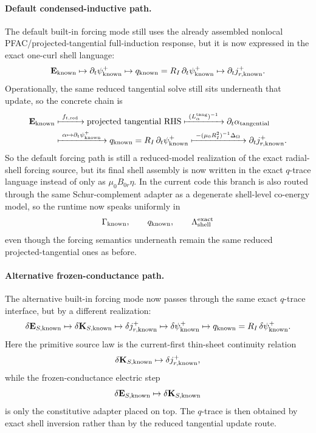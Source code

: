 \documentclass[11pt,a4paper]{article}
\begin{document}
\paragraph{Default condensed-inductive path.}
The default built-in forcing mode still uses the already assembled nonlocal
PFAC/projected-tangential full-induction response, but it is now expressed in
the exact one-curl shell language:
\[
\mathbf E_{\rm known}
\mapsto
\partial_t\psi_{\rm known}^+
\mapsto
q_{\rm known}=R_I\,\partial_t\psi_{\rm known}^+
\mapsto
\partial_t j_{r,\rm known}^+.
\]
Operationally, the same reduced tangential solve still sits underneath that
update, so the concrete chain is
\begin{equation}
\begin{aligned}
\mathbf E_{\rm known}
&\xmapsto{\ f_{t,\mathrm{red}}\ }
\text{projected tangential RHS}
\xmapsto{\ (L_\alpha^{\rm tang})^{-1}\ }
\partial_t\alpha_{\rm tangential}
\\
&\xmapsto{\ \alpha\mapsto \partial_t\psi_{\rm known}^+\ }
q_{\rm known}=R_I\,\partial_t\psi_{\rm known}^+
\xmapsto{\ -(\mu_0 R_I^2)^{-1}\Delta_\Omega\ }
\partial_t j_{r,\rm known}^+.
\end{aligned}
\label{eq:built_in_condensed_forcing_chain}
\end{equation}
So the default forcing path is still a reduced-model realization of the exact
radial-shell forcing source, but its final shell assembly is now written in
the exact \(q\)-trace language instead of only as
\(\mu_0 B_{0r}\eta\). In the current code this branch is also routed through
the same Schur-complement adapter as a degenerate shell-level co-energy model,
so the runtime now speaks uniformly in
\[
\Gamma_{\rm known},\qquad q_{\rm known},\qquad
\Lambda_{\rm shell}^{\rm exact}
\]
even though the forcing semantics underneath remain the same reduced
projected-tangential ones as before.

\paragraph{Alternative frozen-conductance path.}
The alternative built-in forcing mode
 now passes through the same exact
\(q\)-trace interface, but by a different realization:
\[
\delta \mathbf E_{S,\rm known}
\mapsto
\delta \mathbf K_{S,\rm known}
\mapsto
\delta j_{r,\rm known}^+
\mapsto
\delta\psi_{\rm known}^+
\mapsto
q_{\rm known}=R_I\,\delta\psi_{\rm known}^+.
\]
Here the primitive source law is the current-first thin-sheet continuity
relation
\[
\delta \mathbf K_{S,\rm known}\mapsto \delta j_{r,\rm known}^+,
\]
while the frozen-conductance electric step
\[
\delta \mathbf E_{S,\rm known}\mapsto \delta \mathbf K_{S,\rm known}
\]
is only the constitutive adapter placed on top. The \(q\)-trace is then
obtained by exact shell inversion rather than by the reduced tangential update
route.
\end{document}
